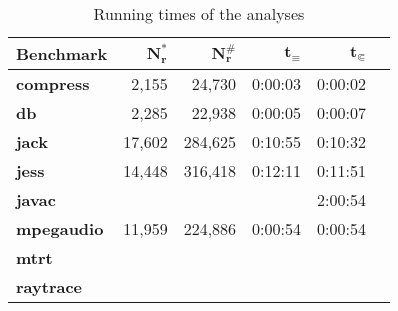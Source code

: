 \begin{table}[h]
\caption{Running times of the analyses}\label{tab:runtimes}
\centering
\setlength{\tabcolsep}{2ex}
\begin{tabular}{lrrrrr}
\toprule
\textbf{Benchmark}   & $\bm{N^*_r}$ & $\bm{N^\#_r}$ & $\bm{t_\equiv}$ & $\bm{t_{\Subset}}$ \\ \midrule
\textbf{compress}    & 2,155        & 24,730        & 0:00:03         & 0:00:02            \\
\textbf{db}          & 2,285        & 22,938        & 0:00:05         & 0:00:07            \\
\textbf{jack}        & 17,602       & 284,625       & 0:10:55         & 0:10:32            \\
\textbf{jess}        & 14,448       & 316,418       & 0:12:11         & 0:11:51            \\
\textbf{javac}       &              &               &                 & 2:00:54            \\
\textbf{mpegaudio}   & 11,959       & 224,886       & 0:00:54         & 0:00:54            \\
\textbf{mtrt}        &              &               &                 &                    \\
\textbf{raytrace}    &              &               &                 &                    \\ \bottomrule
\end{tabular}
\end{table}
